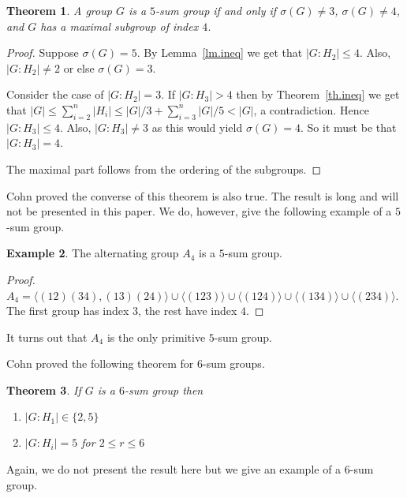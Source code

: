 \documentclass[12pt]{amsart}
\newtheorem{theorem}{Theorem}
\theoremstyle{definition}
\newtheorem{example}[theorem]{Example}
\theoremstyle{remark}
\begin{document}
\begin{theorem}
\label{th.5sum}
A group \( G \) is a \(5\)-sum group if and only if \( \sigma(G) \neq 3 \), \( \sigma(G) \neq 4 \), and	\( G \) has a maximal subgroup of index \( 4 \). 
\end{theorem}
\begin{proof}
Suppose \( \sigma(G) = 5 \).  By Lemma~\ref{lm.ineq} we get that \( |G:H_2| \leq 4 \).  Also, \( |G:H_2| \neq 2 \) or else \( \sigma(G) = 3 \).

Consider the case of \( |G:H_2| = 3 \).  If \( |G:H_3| > 4 \) then by Theorem~\ref{th.ineq} we get that \( |G| \leq \sum_{i=2}^n |H_i| \leq |G|/3 + \sum_{i=3}^n |G|/5 < |G| \), a contradiction.  Hence \( |G:H_3| \leq 4 \).  Also, \( |G:H_3| \neq 3 \) as this would yield \( \sigma(G) = 4 \).  So it must be that \( |G:H_3| = 4 \).

The maximal part follows from the ordering of the subgroups.
\end{proof}

Cohn proved the converse of this theorem is also true.  The result is long and will not be presented in this paper.  We do, however, give the following example of a \(5\)-sum group.

\begin{example}
The alternating group \(A_4\) is a \(5\)-sum group.
\end{example}
\begin{proof}
\(A_4 = \langle (1 2)(3 4), (1 3)(2 4)\rangle \cup \langle (1 2 3)\rangle \cup \langle(1 2 4)\rangle \cup \langle(1 3 4)\rangle \cup \langle(2 3 4)\rangle\).  The first group has index \(3\), the rest have index \(4\). 
\end{proof}

It turns out that \(A_4\) is the only primitive \(5\)-sum group.

Cohn proved the following theorem for \(6\)-sum groups.

\begin{theorem}
\label{th.6sum}
If \( G \) is a \(6\)-sum group then
\begin{enumerate}
	\item \( |G:H_1| \in \{ 2,5 \} \)
	\item \( |G:H_i| = 5 \) for \( 2 \leq r \leq 6 \)
\end{enumerate}
\end{theorem}

Again, we do not present the result here but we give an example of a \(6\)-sum group.
\end{document}
